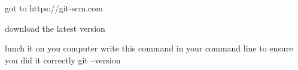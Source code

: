 got to 
https://git-scm.com 

download the latest version 

lunch it on you computer
write this command in your command line to ensure you did it correctly 
git --version 